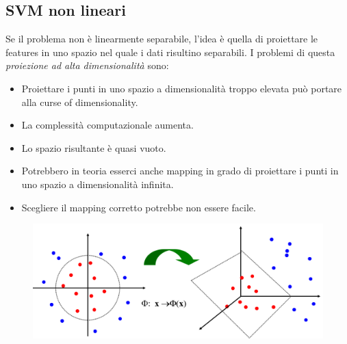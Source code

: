 \documentclass[a4paper,oneside,titlepage]{book}
\begin{document}
\subsection{SVM non lineari}
Se il problema non è linearmente separabile, l'idea è quella di proiettare le features in uno spazio nel quale i dati risultino separabili. I problemi di questa \textit{proiezione ad alta dimensionalità} sono:
\begin{itemize}
    \item Proiettare i punti in uno spazio a dimensionalità troppo elevata può portare alla curse of dimensionality.
    \item La complessità computazionale aumenta.
    \item Lo spazio risultante è quasi vuoto.
    \item Potrebbero in teoria esserci anche mapping in grado di proiettare i punti in uno spazio a dimensionalità infinita.
    \item Scegliere il mapping corretto potrebbe non essere facile.
\end{itemize}
\begin{figure}[htp]
	\centering
	\includegraphics[width=\textwidth, height=\textheight, keepaspectratio]{svm6.png}
\end{figure}
\end{document}
